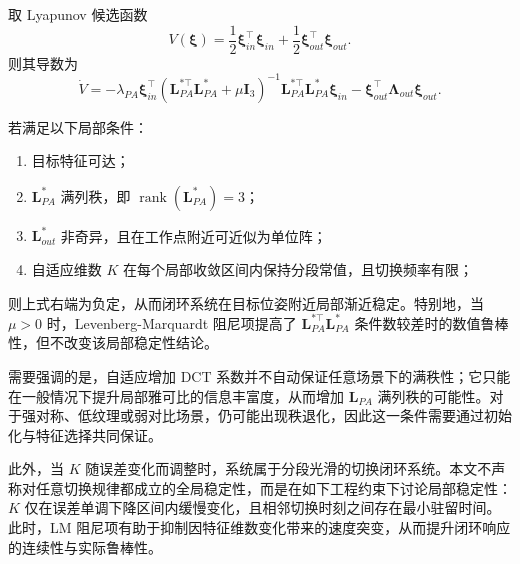 \documentclass{article}
\begin{document}
取 Lyapunov 候选函数
\begin{equation}
V(\boldsymbol{\xi}) =
\frac{1}{2}\boldsymbol{\xi}_{in}^{\top}\boldsymbol{\xi}_{in}
+ \frac{1}{2}\boldsymbol{\xi}_{out}^{\top}\boldsymbol{\xi}_{out}.
\end{equation}
则其导数为
\begin{equation}
\dot{V}
=
-\lambda_{PA}\boldsymbol{\xi}_{in}^{\top}
(\mathbf{L}_{PA}^{*\top}\mathbf{L}_{PA}^{*} + \mu \mathbf{I}_3)^{-1}
\mathbf{L}_{PA}^{*\top}\mathbf{L}_{PA}^{*}\boldsymbol{\xi}_{in}
- \boldsymbol{\xi}_{out}^{\top}\boldsymbol{\Lambda}_{out}\boldsymbol{\xi}_{out}.
\end{equation}

若满足以下局部条件：
\begin{enumerate}
    \item 目标特征可达；
    \item $\mathbf{L}_{PA}^{*}$ 满列秩，即 $\operatorname{rank}(\mathbf{L}_{PA}^{*}) = 3$；
    \item $\mathbf{L}_{out}^{*}$ 非奇异，且在工作点附近可近似为单位阵；
    \item 自适应维数 $K$ 在每个局部收敛区间内保持分段常值，且切换频率有限；
\end{enumerate}
则上式右端为负定，从而闭环系统在目标位姿附近局部渐近稳定。特别地，当 $\mu > 0$ 时，Levenberg-Marquardt 阻尼项提高了 $\mathbf{L}_{PA}^{*\top}\mathbf{L}_{PA}^{*}$ 条件数较差时的数值鲁棒性，但不改变该局部稳定性结论。

需要强调的是，自适应增加 DCT 系数并不自动保证任意场景下的满秩性；它只能在一般情况下提升局部雅可比的信息丰富度，从而增加 $\mathbf{L}_{PA}$ 满列秩的可能性。对于强对称、低纹理或弱对比场景，仍可能出现秩退化，因此这一条件需要通过初始化与特征选择共同保证。

此外，当 $K$ 随误差变化而调整时，系统属于分段光滑的切换闭环系统。本文不声称对任意切换规律都成立的全局稳定性，而是在如下工程约束下讨论局部稳定性：$K$ 仅在误差单调下降区间内缓慢变化，且相邻切换时刻之间存在最小驻留时间。此时，LM 阻尼项有助于抑制因特征维数变化带来的速度突变，从而提升闭环响应的连续性与实际鲁棒性。


\end{document}
